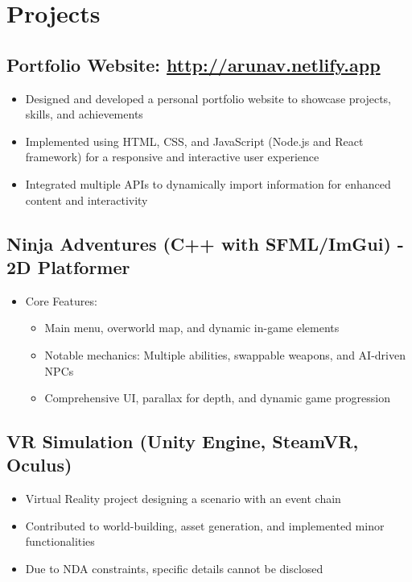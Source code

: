 \documentclass[10pt]{article}
\begin{document}
\section{Projects}
\subsection{Portfolio Website: \href{http://arunav.netlify.app}{http://arunav.netlify.app} \hfill }
\begin{itemize}
    \item Designed and developed a personal portfolio website to showcase projects, skills, and achievements
    \item Implemented using HTML, CSS, and JavaScript (Node.js and React framework) for a responsive and interactive user experience
    \item Integrated multiple APIs to dynamically import information for enhanced content and interactivity
\end{itemize}

\subsection{Ninja Adventures (C++ with SFML/ImGui) - 2D Platformer \hfill }
\begin{itemize}
    
    \item Core Features:
    \begin{itemize}
        \item Main menu, overworld map, and dynamic in-game elements
        \item Notable mechanics: Multiple abilities, swappable weapons, and AI-driven NPCs
        \item Comprehensive UI, parallax for depth, and dynamic game progression
    \end{itemize}
\end{itemize}

\subsection{VR Simulation (Unity Engine, SteamVR, Oculus) \hfill }
\begin{itemize}
    \item Virtual Reality project designing a scenario with an event chain
    \item Contributed to world-building, asset generation, and implemented minor functionalities
    \item Due to NDA constraints, specific details cannot be disclosed
\end{itemize}
\end{document}
